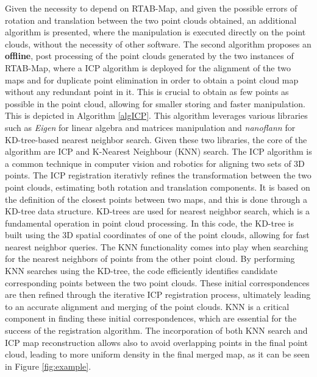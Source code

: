 Given the necessity to depend on RTAB-Map, and given the possible errors of rotation and translation between the two point clouds obtained, an additional algorithm is presented, where the manipulation is executed directly on the point clouds, without the necessity of other software. The second algorithm proposes an \textbf{offline}, post processing of the point clouds generated by the two instances of RTAB-Map, where a ICP algorithm is deployed for the alignment of the two maps and for duplicate point elimination in order to obtain a point cloud map without any redundant point in it. This is crucial to obtain as few points as possible in the point cloud, allowing for smaller storing and faster manipulation. This is depicted in  Algorithm \ref{algICP}. This algorithm leverages various libraries such as \textit{Eigen} \cite{guennebaud2010eigen} for linear algebra and matrices manipulation and \textit{nanoflann} \cite{blanco2017nanoflann} for KD-tree-based nearest neighbor search. Given these two libraries, the core of the algorithm are ICP and K-Nearest Neighbour (KNN) search. The ICP algorithm is a common technique in computer vision and robotics for aligning two sets of 3D points. The ICP registration iterativly refines the transformation between the two point clouds, estimating both rotation and translation components. It is based on the definition of the closest points between two maps, and this is done through a KD-tree data structure. KD-trees are used for nearest neighbor search, which is a fundamental operation in point cloud processing. In this code, the KD-tree is built using the 3D spatial coordinates of one of the point clouds, allowing for fast nearest neighbor queries. The KNN functionality comes into play when searching for the nearest neighbors of points from the other point cloud. By performing KNN searches using the KD-tree, the code efficiently identifies candidate corresponding points between the two point clouds. These initial correspondences are then refined through the iterative ICP registration process, ultimately leading to an accurate alignment and merging of the point clouds. KNN is a critical component in finding these initial correspondences, which are essential for the success of the registration algorithm. The incorporation of both KNN search and ICP map reconstruction allows also to avoid overlapping points in the final point cloud, leading to more uniform density in the final merged map, as it can be seen in Figure \ref{fig:example}.

